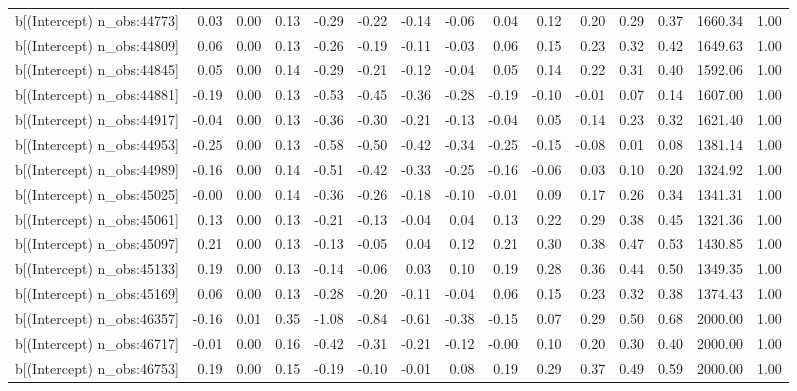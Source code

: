 \begin{table}[ht]
\begin{tabular}{rrrrrrrrrrrrrrr}
  b[(Intercept) n\_obs:44773] & 0.03 & 0.00 & 0.13 & -0.29 & -0.22 & -0.14 & -0.06 & 0.04 & 0.12 & 0.20 & 0.29 & 0.37 & 1660.34 & 1.00 \\ 
  b[(Intercept) n\_obs:44809] & 0.06 & 0.00 & 0.13 & -0.26 & -0.19 & -0.11 & -0.03 & 0.06 & 0.15 & 0.23 & 0.32 & 0.42 & 1649.63 & 1.00 \\ 
  b[(Intercept) n\_obs:44845] & 0.05 & 0.00 & 0.14 & -0.29 & -0.21 & -0.12 & -0.04 & 0.05 & 0.14 & 0.22 & 0.31 & 0.40 & 1592.06 & 1.00 \\ 
  b[(Intercept) n\_obs:44881] & -0.19 & 0.00 & 0.13 & -0.53 & -0.45 & -0.36 & -0.28 & -0.19 & -0.10 & -0.01 & 0.07 & 0.14 & 1607.00 & 1.00 \\ 
  b[(Intercept) n\_obs:44917] & -0.04 & 0.00 & 0.13 & -0.36 & -0.30 & -0.21 & -0.13 & -0.04 & 0.05 & 0.14 & 0.23 & 0.32 & 1621.40 & 1.00 \\ 
  b[(Intercept) n\_obs:44953] & -0.25 & 0.00 & 0.13 & -0.58 & -0.50 & -0.42 & -0.34 & -0.25 & -0.15 & -0.08 & 0.01 & 0.08 & 1381.14 & 1.00 \\ 
  b[(Intercept) n\_obs:44989] & -0.16 & 0.00 & 0.14 & -0.51 & -0.42 & -0.33 & -0.25 & -0.16 & -0.06 & 0.03 & 0.10 & 0.20 & 1324.92 & 1.00 \\ 
  b[(Intercept) n\_obs:45025] & -0.00 & 0.00 & 0.14 & -0.36 & -0.26 & -0.18 & -0.10 & -0.01 & 0.09 & 0.17 & 0.26 & 0.34 & 1341.31 & 1.00 \\ 
  b[(Intercept) n\_obs:45061] & 0.13 & 0.00 & 0.13 & -0.21 & -0.13 & -0.04 & 0.04 & 0.13 & 0.22 & 0.29 & 0.38 & 0.45 & 1321.36 & 1.00 \\ 
  b[(Intercept) n\_obs:45097] & 0.21 & 0.00 & 0.13 & -0.13 & -0.05 & 0.04 & 0.12 & 0.21 & 0.30 & 0.38 & 0.47 & 0.53 & 1430.85 & 1.00 \\ 
  b[(Intercept) n\_obs:45133] & 0.19 & 0.00 & 0.13 & -0.14 & -0.06 & 0.03 & 0.10 & 0.19 & 0.28 & 0.36 & 0.44 & 0.50 & 1349.35 & 1.00 \\ 
  b[(Intercept) n\_obs:45169] & 0.06 & 0.00 & 0.13 & -0.28 & -0.20 & -0.11 & -0.04 & 0.06 & 0.15 & 0.23 & 0.32 & 0.38 & 1374.43 & 1.00 \\ 
  b[(Intercept) n\_obs:46357] & -0.16 & 0.01 & 0.35 & -1.08 & -0.84 & -0.61 & -0.38 & -0.15 & 0.07 & 0.29 & 0.50 & 0.68 & 2000.00 & 1.00 \\ 
  b[(Intercept) n\_obs:46717] & -0.01 & 0.00 & 0.16 & -0.42 & -0.31 & -0.21 & -0.12 & -0.00 & 0.10 & 0.20 & 0.30 & 0.40 & 2000.00 & 1.00 \\ 
  b[(Intercept) n\_obs:46753] & 0.19 & 0.00 & 0.15 & -0.19 & -0.10 & -0.01 & 0.08 & 0.19 & 0.29 & 0.37 & 0.49 & 0.59 & 2000.00 & 1.00 \\ 

\end{tabular}
\end{table}
